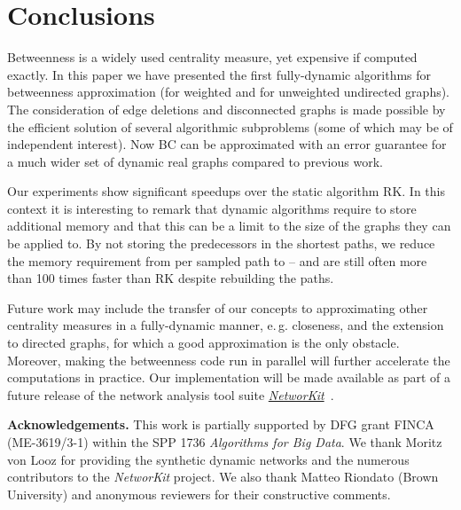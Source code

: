 \documentclass[english]{llncs}
\newcommand{\eg}{e.\,g.\xspace}
\newcommand{\vd}{\xspace}
\newcommand{\rk}{\textsf{RK}\xspace}
\begin{document}
\section{Conclusions}
Betweenness is a widely used centrality measure, yet expensive if computed exactly.
In this paper we have presented the first fully-dynamic algorithms for betweenness approximation  
(for weighted and for unweighted undirected graphs). 
The consideration of edge deletions and disconnected graphs is made possible by the efficient solution
of several algorithmic subproblems (some of which may be of independent interest).
Now BC can be approximated with an error guarantee for a much wider 
set of dynamic real graphs compared to previous work. 


Our experiments show significant speedups over the static algorithm \rk. In this context it is interesting
to remark that dynamic algorithms require to store additional memory and that this can be a limit to the size 
of the graphs they can be applied to. 
By not storing the predecessors in the shortest paths, we reduce the memory requirement from  per 
sampled path to  -- and are still often more than 100 times faster than \rk despite rebuilding the paths.


Future work may include the transfer of our concepts to approximating other centrality measures in a fully-dynamic
manner, \eg closeness, and the extension to directed graphs, for which a good \vd approximation is the only obstacle.
Moreover, making the betweenness code run in parallel will further accelerate the
computations in practice.
Our implementation will be made available as part of a future release of the network analysis tool suite 
\href{http://networkit.iti.kit.edu}{\textit{NetworKit}}~\cite{DBLP:journals/corr/StaudtSM14}.


\bigskip

\renewcommand{\baselinestretch}{0.25}
\begin{scriptsize}
\textbf{Acknowledgements.}
This work is partially supported by DFG grant FINCA (ME-3619/3-1) within the SPP 1736 \emph{Algorithms for Big Data}.
We thank Moritz von Looz for providing the synthetic dynamic networks and the numerous contributors to 
the \textit{NetworKit} project. We also thank Matteo Riondato (Brown University) and anonymous reviewers for their constructive comments.
\end{scriptsize}
\renewcommand{\baselinestretch}{1.0}



\end{document}

